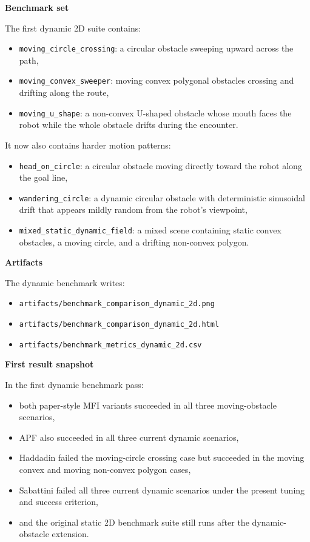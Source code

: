 \documentclass[11pt]{article}
\begin{document}
\textbf{Benchmark set}

The first dynamic 2D suite contains:
\begin{itemize}[leftmargin=*]
  \item \texttt{moving\_circle\_crossing}: a circular obstacle sweeping upward across the path,
  \item \texttt{moving\_convex\_sweeper}: moving convex polygonal obstacles crossing and drifting along the route,
  \item \texttt{moving\_u\_shape}: a non-convex U-shaped obstacle whose mouth faces the robot while the whole obstacle drifts during the encounter.
\end{itemize}

It now also contains harder motion patterns:
\begin{itemize}[leftmargin=*]
  \item \texttt{head\_on\_circle}: a circular obstacle moving directly toward the robot along the goal line,
  \item \texttt{wandering\_circle}: a dynamic circular obstacle with deterministic sinusoidal drift that appears mildly random from the robot's viewpoint,
  \item \texttt{mixed\_static\_dynamic\_field}: a mixed scene containing static convex obstacles, a moving circle, and a drifting non-convex polygon.
\end{itemize}

\textbf{Artifacts}

The dynamic benchmark writes:
\begin{itemize}[leftmargin=*]
  \item \texttt{artifacts/benchmark\_comparison\_dynamic\_2d.png}
  \item \texttt{artifacts/benchmark\_comparison\_dynamic\_2d.html}
  \item \texttt{artifacts/benchmark\_metrics\_dynamic\_2d.csv}
\end{itemize}

\textbf{First result snapshot}

In the first dynamic benchmark pass:
\begin{itemize}[leftmargin=*]
  \item both paper-style MFI variants succeeded in all three moving-obstacle scenarios,
  \item APF also succeeded in all three current dynamic scenarios,
  \item Haddadin failed the moving-circle crossing case but succeeded in the moving convex and moving non-convex polygon cases,
  \item Sabattini failed all three current dynamic scenarios under the present tuning and success criterion,
  \item and the original static 2D benchmark suite still runs after the dynamic-obstacle extension.
\end{itemize}
\end{document}
